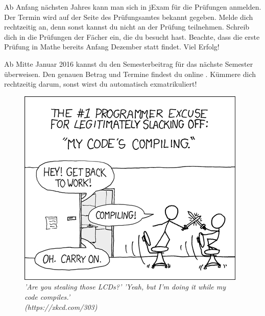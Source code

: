 \begin{itemize}[leftmargin=*]
\newpage


Ab Anfang nächsten Jahres kann man sich in jExam für die Prüfungen anmelden. Der Termin wird auf der Seite des Prüfungsamtes bekannt gegeben. Melde dich rechtzeitig an, denn sonst kannst du nicht an der Prüfung teilnehmen.
Schreib dich in die Prüfungen der Fächer ein, die du besucht hast.
Beachte, dass die erste Prüfung in Mathe bereits Anfang Dezember statt findet.
Viel Erfolg!

Ab Mitte Januar 2016 kannst du den Semesterbeitrag für das nächste Semester überweisen.
Den genauen Betrag und Termine findest du online .
Kümmere dich rechtzeitig darum, sonst wirst du automatisch exmatrikuliert!

\end{itemize}

\vfill

\begin{figure}[h!]
\centering
\includegraphics[scale=.4]{img/xkcd/compiling.png}
\caption*{{\small \textit{'Are you stealing those LCDs?' 'Yeah, but I'm doing it while my code compiles.'\\\hspace*{1mm}\hfill(https://xkcd.com/303)}}}
\end{figure}
